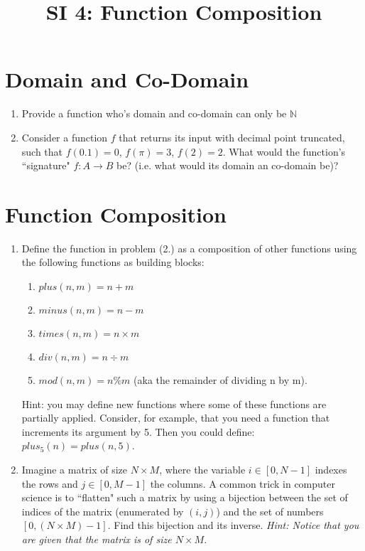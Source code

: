 \documentclass[12pt]{article}
\date{}
\author{}
\title{SI 4: Function Composition}
\begin{document}
	
	\maketitle
	\section{Domain and Co-Domain}
	\begin{enumerate}
		\item Provide a function who's domain and co-domain can only be $\mathbb{N}$
		\item Consider a function $f$ that returns its input with decimal point truncated, such that $f(0.1) = 0$, $f(\pi) = 3$, $f(2) =2$. What would the function's ``signature" $f: A \to B$ be? (i.e. what would its domain an co-domain be)?
	\end{enumerate}
	\section{Function Composition}
	
	\begin{enumerate}[resume]
		\item Define the function in problem (2.) as a composition of other functions using the following functions as building blocks:
		\begin{enumerate}
			\item $plus(n,m) = n+m$
			\item $minus(n,m) = n-m$
			\item $times(n,m) = n \times m$
			\item $div(n,m) = n \div m$
			\item $mod(n,m) = n \% m$ (aka the remainder of dividing n by m).
		\end{enumerate}
		Hint: you may define new functions where some of these functions are partially applied. Consider, for example, that you need a function that increments its argument by 5. Then you could define: $plus_5(n) = plus(n,5)$.
		\item Imagine a matrix of size $N\times M$, where the variable $i\in [0,N-1]$ indexes the rows and $j \in [0,M-1]$ the columns. A common trick in computer science is to ``flatten" such a matrix by using a bijection between the set of indices of the matrix (enumerated by $(i,j)$) and the set of numbers $[0,(N\times M)-1]$. Find this bijection and its inverse. \textit{Hint: Notice that you are given that the matrix is of size $N\times M$.}
		\end{enumerate}

	
\end{document}
